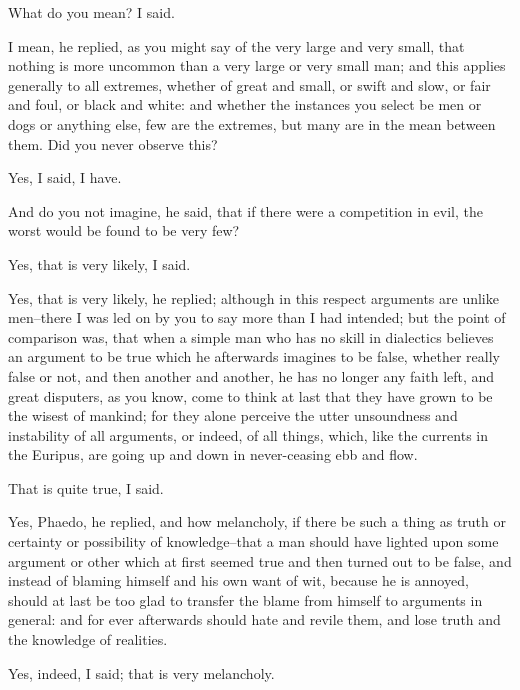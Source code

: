 What do you mean? I said.

I mean, he replied, as you might say of the very large and very small,
that nothing is more uncommon than a very large or very small man; and
this applies generally to all extremes, whether of great and small, or
swift and slow, or fair and foul, or black and white: and whether
the instances you select be men or dogs or anything else, few are the
extremes, but many are in the mean between them. Did you never observe
this?

Yes, I said, I have.

And do you not imagine, he said, that if there were a competition in
evil, the worst would be found to be very few?

Yes, that is very likely, I said.

Yes, that is very likely, he replied; although in this respect arguments
are unlike men--there I was led on by you to say more than I had
intended; but the point of comparison was, that when a simple man who
has no skill in dialectics believes an argument to be true which he
afterwards imagines to be false, whether really false or not, and
then another and another, he has no longer any faith left, and great
disputers, as you know, come to think at last that they have grown to be
the wisest of mankind; for they alone perceive the utter unsoundness and
instability of all arguments, or indeed, of all things, which, like the
currents in the Euripus, are going up and down in never-ceasing ebb and
flow.

That is quite true, I said.

Yes, Phaedo, he replied, and how melancholy, if there be such a thing as
truth or certainty or possibility of knowledge--that a man should have
lighted upon some argument or other which at first seemed true and then
turned out to be false, and instead of blaming himself and his own want
of wit, because he is annoyed, should at last be too glad to transfer
the blame from himself to arguments in general: and for ever afterwards
should hate and revile them, and lose truth and the knowledge of
realities.

Yes, indeed, I said; that is very melancholy.

